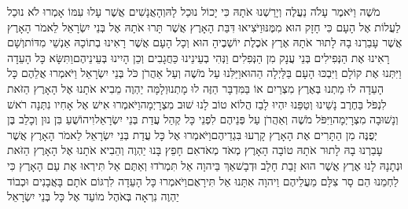 \documentclass[../main/main.tex]{subfiles}
\begin{document}
\begin{multicols*}{\ncols}
מֹשֶׁה וַיֹּאמֶר עָלֹה נַעֲלֶה וְיָרַשְׁנוּ אֹתָהּ כִּי יָכוֹל נוּכַל לָהּ\PreVerseSpace{}וְהָאֲנָשִׁים אֲשֶׁר עָלוּ עִמּוֹ אָמְרוּ לֹא נוּכַל לַעֲלוֹת אֶל הָעָם כִּי חָזָק הוּא מִמֶּנּוּ\PreVerseSpace{}וַיֹּצִיאוּ דִּבַּת הָאָרֶץ אֲשֶׁר תָּרוּ אֹתָהּ אֶל בְּנֵי יִשְׂרָאֵל לֵאמֹר הָאָרֶץ אֲשֶׁר עָבַרְנוּ בָהּ לָתוּר אֹתָהּ אֶרֶץ אֹכֶלֶת יוֹשְׁבֶיהָ הוּא וְכָל הָעָם אֲשֶׁר רָאִינוּ בְתוֹכָהּ אַנְשֵׁי מִדּוֹת\PreVerseSpace{}וְשָׁם רָאִינוּ אֶת הַנְּפִילִים בְּנֵי עֲנָק מִן הַנְּפִלִים וַנְּהִי בְעֵינֵינוּ כַּחֲגָבִים וְכֵן הָיִינוּ בְּעֵינֵיהֶם\PreChapterSpace{}וַתִּשָּׂא כָּל הָעֵדָה וַיִּתְּנוּ אֶת קוֹלָם וַיִּבְכּוּ הָעָם בַּלַּיְלָה הַהוּא\PreVerseSpace{}וַיַּלִּנוּ\SubEnd{} עַל מֹשֶׁה וְעַל אַהֲרֹן כֹּל בְּנֵי יִשְׂרָאֵל וַיֹּאמְרוּ אֲלֵהֶם כָּל הָעֵדָה לוּ מַתְנוּ בְּאֶרֶץ מִצְרַיִם אוֹ בַּמִּדְבָּר הַזֶּה לוּ מָתְנוּ\PreVerseSpace{}וְלָמָּה יַהְוֶה מֵבִיא אֹתָנוּ אֶל הָאָרֶץ הַזֹּאת לִנְפֹּל בַּחֶרֶב נָשֵׁינוּ וְטַפֵּנוּ יִהְיוּ לָבַז הֲלוֹא טוֹב לָנוּ שׁוּב מִצְרָיְמָה\PreVerseSpace{}וַיֹּאמְרוּ אִישׁ אֶל אָחִיו נִתְּנָה רֹאשׁ וְנָשׁוּבָה מִצְרָיְמָה\PreVerseSpace{}וַיִּפֹּל מֹשֶׁה וְאַהֲרֹן עַל פְּנֵיהֶם לִפְנֵי כָּל קְהַל עֲדַת בְּנֵי יִשְׂרָאֵל\PreVerseSpace{}וִיהוֹשֻׁעַ בִּן נוּן וְכָלֵב בֶּן יְפֻנֶּה מִן הַתָּרִים אֶת הָאָרֶץ קָרְעוּ בִּגְדֵיהֶם\PreVerseSpace{}וַיֹּאמְרוּ אֶל כָּל עֲדַת בְּנֵי יִשְׂרָאֵל לֵאמֹר הָאָרֶץ אֲשֶׁר עָבַרְנוּ בָהּ לָתוּר אֹתָהּ טוֹבָה הָאָרֶץ מְאֹד מְאֹד\PreVerseSpace{}אִם חָפֵץ בָּנוּ יַהְוֶה וְהֵבִיא אֹתָנוּ אֶל הָאָרֶץ הַזֹּאת וּנְתָנָהּ לָנוּ אֶרֶץ אֲשֶׁר הוּא זָבַת חָלָב וּדְבָשׁ\PreVerseSpace{}אַךְ בַּיהוָה אַל תִּמְרֹדוּ וְאַתֶּם אַל תִּירְאוּ אֶת עַם הָאָרֶץ כִּי לַחְמֵנוּ הֵם סָר צִלָּם מֵעֲלֵיהֶם וַיהוָה אִתָּנוּ אַל תִּירָאֻם\PreVerseSpace{}וַיֹּאמְרוּ כָּל הָעֵדָה לִרְגּוֹם אֹתָם בָּאֲבָנִים וּכְבוֹד יַהְוֶה נִרְאָה בְּאֹהֶל מוֹעֵד אֶל כָּל בְּנֵי יִשְׂרָאֵל\OpenSection{}\par

\end{multicols*}
\end{document}
